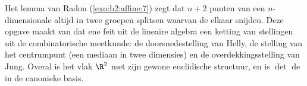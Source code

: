 \begin{problem}\label{pb:b2:affine:1}
Het lemma van Radon (\cref{exo:b2:affine:7}) zegt dat $n + 2$
punten van een $n$-dimensionale  altijd in twee
groepen splitsen waarvan de  elkaar snijden. Deze
opgave maakt van dat ene feit uit de lineaire algebra een ketting
van stellingen uit de combinatorische meetkunde: de
doorsnedestelling van Helly, de stelling van het centrumpunt (een
mediaan in twee dimensies) en de overdekkingsstelling van Jung.
Overal is het vlak $\R^2$ met zijn gewone euclidische structuur, en
is $\det$ de  in de canonieke basis.


\end{problem}
